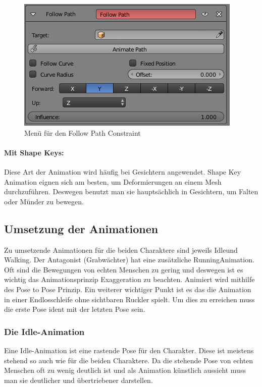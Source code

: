 \begin{figure}[H]
    \centering

    \includegraphics[width=.8\textwidth]{images/animation_path_constraint.png}
    \caption{Menü für den Follow Path Constraint}
\end{figure}

\paragraph{Mit Shape Keys:}
Diese Art der Animation wird häufig bei Gesichtern angewendet. Shape Key Animation eignen sich am besten, um Deformierungen an einem Mesh durchzuführen.
Deswegen benutzt man sie hauptsächlich in Gesichtern, um Falten oder Münder zu bewegen.

\subsection{Umsetzung der Animationen}
Zu umsetzende Animationen für die beiden Charaktere sind jeweils \dq Idle\dq und \dq Walking\dq. Der Antagonist (Grabwächter)
hat eine zusätzliche \dq Running\dq Animation. Oft sind die Bewegungen von echten Menschen zu gering und deswegen ist es wichtig das Animationsprinzip \dq Exaggeration\dq
zu beachten. Animiert wird mithilfe des Pose to Pose Prinzip. Ein weiterer wichtiger Punkt ist es das die Animation in einer Endlosschleife
ohne sichtbaren Ruckler spielt. Um dies zu erreichen muss die erste Pose ident mit der letzten Pose sein.

\subsubsection{Die Idle-Animation}
Eine Idle-Animation ist eine rastende Pose für den Charakter. Diese ist meistens stehend so auch wie für die beiden Charaktere.
Da die stehende Pose von echten Menschen oft zu wenig deutlich ist und als Animation künstlich aussieht muss man sie deutlicher und übertriebener darstellen.

